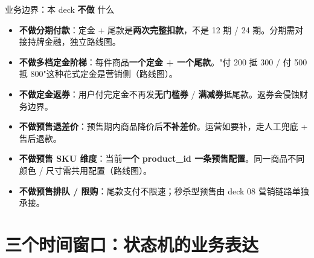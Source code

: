 \documentclass[aspectratio=169,11pt]{beamer}
\begin{document}
\begin{frame}[shrink]{业务边界：本 deck \textbf{不做} 什么}
\begin{itemize}\small
  \item \textbf{不做分期付款}：定金 + 尾款是\textbf{两次完整扣款}，不是 12 期 / 24 期。分期需对接持牌金融，独立路线图。
  \item \textbf{不做多档定金阶梯}：每件商品\textbf{一个定金 + 一个尾款}。"付 200 抵 300 / 付 500 抵 800"这种花式定金是营销侧（路线图）。
  \item \textbf{不做定金返券}：用户付完定金不再发\textbf{无门槛券} / \textbf{满减券}抵尾款。返券会侵蚀财务边界。
  \item \textbf{不做预售退差价}：预售期内商品降价后\textbf{不补差价}。运营如要补，走人工兜底 + 售后退款。
  \item \textbf{不做预售 SKU 维度}：当前\textbf{一个 product\_id 一条预售配置}。同一商品不同颜色 / 尺寸需共用配置（路线图）。
  \item \textbf{不做预售排队 / 限购}：尾款支付不限速；秒杀型预售由 deck 08 营销链路单独承接。
\end{itemize}
\end{frame}

\section{三个时间窗口：状态机的业务表达}
\end{document}
